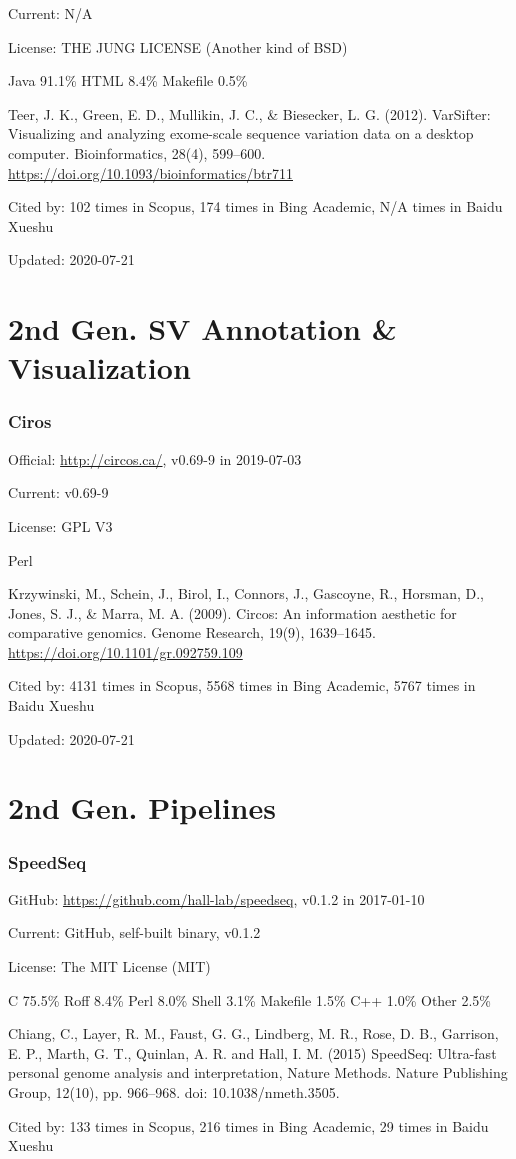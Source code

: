 \documentclass[]{article}
\newcommand{\cb}[3]{\par Cited by: {\color{blue}\Huge #1} times in Scopus, {\color{blue}\Huge #2} times in Bing Academic, {\color{blue}\Huge #3} times in Baidu Xueshu}
\begin{document}
Current: N/A

License: THE JUNG LICENSE (Another kind of BSD)

Java 91.1\% HTML 8.4\% Makefile 0.5\%

Teer, J. K., Green, E. D., Mullikin, J. C., \& Biesecker, L. G. (2012). VarSifter: Visualizing and analyzing exome-scale sequence variation data on a desktop computer. Bioinformatics, 28(4), 599–600. \url{https://doi.org/10.1093/bioinformatics/btr711}\cb{102}{174}{N/A}

Updated: 2020-07-21

\part{2nd Gen. SV Annotation \& Visualization}

\section{Ciros}

Official: \url{http://circos.ca/}, v0.69-9  in 2019-07-03

Current: v0.69-9

License: GPL V3

Perl

Krzywinski, M., Schein, J., Birol, I., Connors, J., Gascoyne, R., Horsman, D., Jones, S. J., \& Marra, M. A. (2009). Circos: An information aesthetic for comparative genomics. Genome Research, 19(9), 1639–1645. \url{https://doi.org/10.1101/gr.092759.109 }\cb{4131}{5568}{5767}

Updated: 2020-07-21

\part{2nd Gen. Pipelines}
\section{SpeedSeq}

GitHub: \url{https://github.com/hall-lab/speedseq}, v0.1.2 in 2017-01-10

Current: GitHub, self-built binary, v0.1.2

License: The MIT License (MIT)

C 75.5\% Roff 8.4\% Perl 8.0\% Shell 3.1\% Makefile 1.5\% C++ 1.0\% Other 2.5\%

Chiang, C., Layer, R. M., Faust, G. G., Lindberg, M. R., Rose, D. B., Garrison, E. P., Marth, G. T., Quinlan, A. R. and Hall, I. M. (2015) SpeedSeq: Ultra-fast personal genome analysis and interpretation, Nature Methods. Nature Publishing Group, 12(10), pp. 966–968. doi: 10.1038/nmeth.3505.\cb{133}{216}{29}
\end{document}
